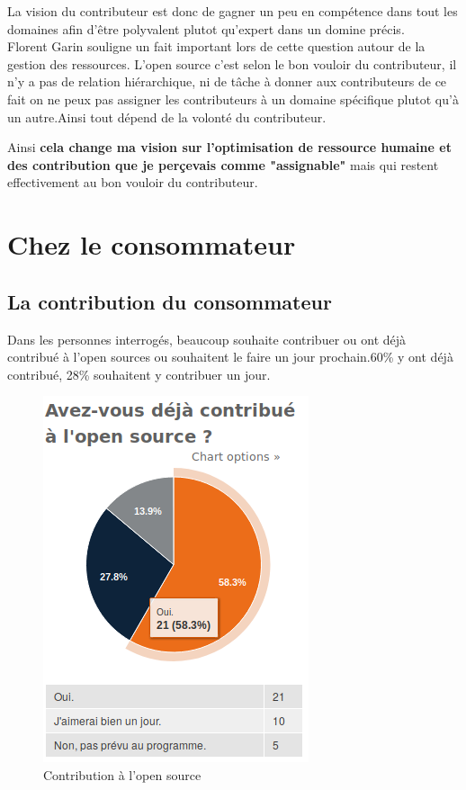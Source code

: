 			La vision du contributeur est donc de gagner un peu en compétence dans tout les domaines afin d'être polyvalent plutot qu'expert dans un domine précis.\\

			Florent Garin souligne un fait important lors de cette question autour de la gestion des ressources.
			L'open source c'est selon le bon vouloir du contributeur, il n'y a pas de relation hiérarchique, ni de tâche à donner aux contributeurs de ce fait on ne peux pas assigner les contributeurs à un domaine spécifique plutot qu'à un autre.Ainsi tout dépend de la volonté du contributeur.

			\begin{center}
				\textit{
				}
			\end{center}

			Ainsi \textbf{cela change ma vision sur l'optimisation de ressource humaine et des contribution que je perçevais comme "assignable"} mais qui restent effectivement au bon vouloir du contributeur.

	\section{Chez le consommateur}

		\subsection{La contribution du consommateur}

			Dans les personnes interrogés, beaucoup souhaite contribuer ou ont déjà contribué à l'open sources ou souhaitent le faire un jour prochain.60\% y ont déjà contribué, 28\% souhaitent y contribuer un jour.

			\begin{figure}[!htb]
				\center
				\includegraphics[scale=0.58]{./img/a4}
				\caption{Contribution à l'open source}
			\end{figure}

